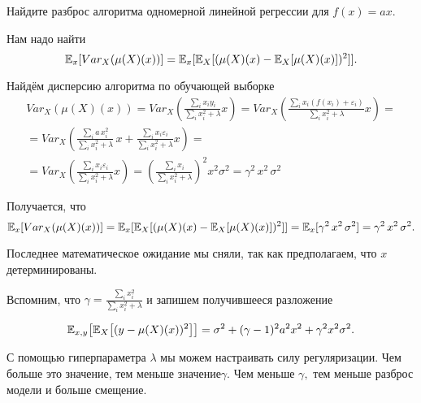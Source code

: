 \documentclass[12pt,fleqn]{article}
\begin{document}
\begin{vkProblem}
Найдите разброс алгоритма одномерной линейной регрессии для $f(x) = ax$. 
\end{vkProblem}
\begin{esSolution}
    Нам надо найти \[ \mathbb{E}_{x}[Var_X(\mu(X)(x))] =  \mathbb{E}_{x} [\mathbb{E}_{X} [(\mu(X)(x) - \mathbb{E}_{X}[\mu(X)(x)] )^2 ]].\]

    Найдём дисперсию алгоритма по обучающей выборке 
    \begin{multline*}
        Var_X(\mu(X)(x)) =  Var_X \left( \frac{\sum_i x_i y_i}{\sum_i x_i^2 + \lambda} x \right) = Var_X \left( \frac{\sum_i x_i (f(x_i) + \varepsilon_i)}{\sum_i x_i^2 + \lambda} x \right) = \\ = Var_X \left( \frac{\sum_i a \, x_i^2}{\sum_i x_i^2 + \lambda} \, x  + \frac{\sum_i x_i \varepsilon_i}{\sum_i x_i^2 + \lambda} x \right) = \\ = Var_X  \left(\frac{\sum_i x_i \varepsilon_i}{\sum_i x_i^2 + \lambda} x \right) = \left(\frac{\sum_i x_i}{\sum_i x_i^2 + \lambda}\right)^2 x^2 \sigma^2 = \gamma^2 \, x^2 \, \sigma^2
    \end{multline*}

    Получается, что 
    \[
    \mathbb{E}_{x}[Var_X(\mu(X)(x))] = \mathbb{E}_{x} [\mathbb{E}_{X} [(\mu(X)(x) - \mathbb{E}_{X}[\mu(X)(x)] )^2 ]] = \mathbb{E}_{x}[\gamma^2 \, x^2 \, \sigma^2] = \gamma^2 \, x^2 \, \sigma^2.
    \]

    Последнее математическое ожидание мы сняли, так как предполагаем, что $x$ детерминированы. 
\end{esSolution}

Вспомним, что $\gamma = \frac{\sum_i x_i^2}{\sum_i x_i^2 + \lambda}$ и запишем получившееся разложение

$$
\mathbb{E}_{x, y}\bigl[\mathbb{E}_{X}\bigl[ (y - \mu(X)(x))^2 \bigr]\bigr] = \sigma^2 + (\gamma - 1)^2 a^2 x^2 + \gamma^2 x^2 \sigma^2.
$$

С помощью гиперпараметра $\lambda$ мы можем настраивать силу регуляризации. Чем больше это значение, тем меньше значение$\gamma$. Чем меньше $\gamma,$ тем меньше разброс модели и больше смещение. 
\end{document}
